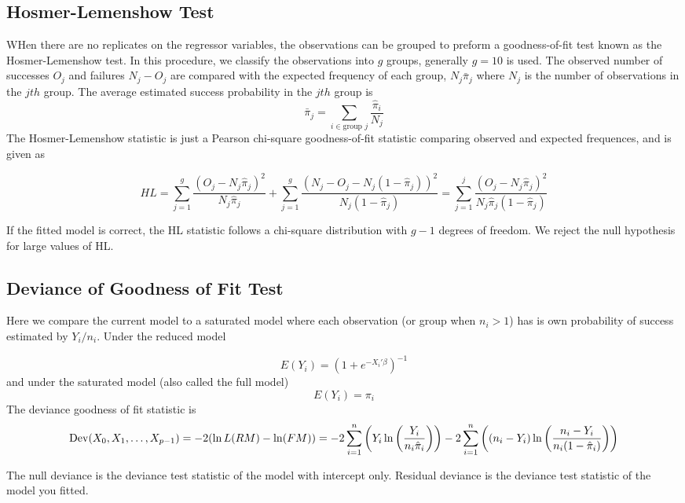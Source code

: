 \subsection{Hosmer-Lemenshow Test}

WHen there are no replicates on the regressor variables, the observations can be grouped to preform a goodness-of-fit test known as the Hosmer-Lemenshow test. In this procedure, we classify the observations into $g$ groups, generally $g=10$ is used. The observed number of successes $O_j$ and failures $N_j - O_j$ are compared with the expected frequency of each group, $N_j\bar{\pi}_j$ where $N_j$ is the number of observations in the $jth$ group. The average estimated success probability in the $jth$ group is 
\[\bar{\pi}_j = \sum_{i \in \text{group }j} \frac{\hat{\pi}_i}{N_j}\]
The Hosmer-Lemenshow statistic is just a Pearson chi-square goodness-of-fit statistic comparing observed and expected frequences, and is given as 

\[HL = \sum_{j=1}^g \frac{(O_j - N_j\hat{\pi}_j)^2}{N_j\hat{\pi}_j} + \sum_{j=1}^g \frac{(N_j - O_j - N_j(1-\hat{\pi}_j))^2}{N_j(1-\hat{\pi}_j)} = \sum_{j=1}^j \frac{(O_j - N_j\hat{\pi}_j)^2}{N_j\hat{\pi}_j(1-\hat{\pi}_j)}\]

If the fitted model is correct, the HL statistic follows a chi-square distribution with $g-1$ degrees of freedom. We reject the null hypothesis for large values of HL.

\subsection{Deviance of Goodness of Fit Test}

Here we compare the current model to a saturated model where each observation (or group when $n_i > 1$) has is own probability of success estimated by $Y_i / n_i$. Under the reduced model 

\[E(Y_i) = \left(1 + e^{-X_i'\beta}\right)^{-1}\]
and under the saturated model (also called the full model)
\[E(Y_i) = \pi_i\]
The deviance goodness of fit statistic is 
\[\operatorname{Dev}(X_0, X_1, \ldots, X_{p-1}) = -2 (\ln L(RM) - \ln(FM)) = -2 \sum_{i=1}^n \left(Y_i\ln\left(\frac{Y_i}{n_i\hat{\pi}_i}\right)\right) - 2\sum_{i=1}^n \left((n_i-Y_i)\ln\left(\frac{n_i - Y_i}{n_i(1-\hat{\pi}_i)}\right)\right)\]

The null deviance is the deviance test statistic of the model with intercept only. Residual deviance is the deviance test statistic of the model you fitted. 

